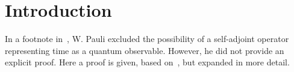 \section{Introduction}

In a footnote in~\parencite{PauliFootnote}, W. Pauli excluded the possibility
of a self-adjoint operator representing time as a quantum observable.
However, he did not provide an explicit proof.
Here a proof is given, based on~\parencite{Galapon2002}, but expanded in more detail.